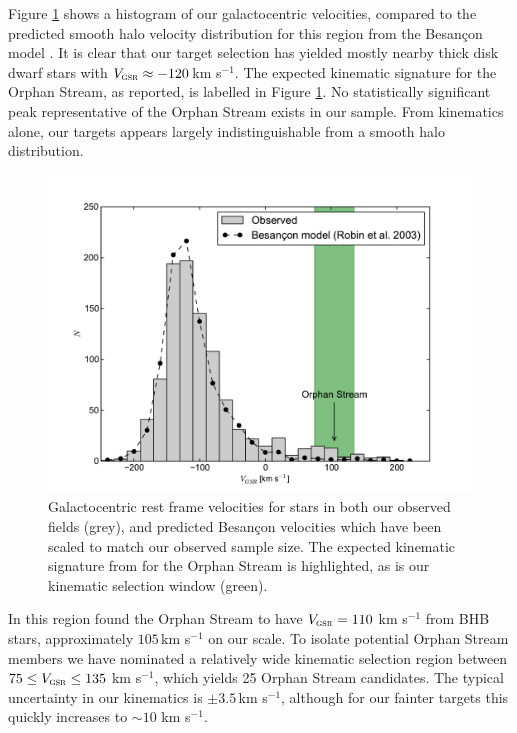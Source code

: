 \documentclass{emulateapj}
\begin{document}
Figure \ref{fig:velocities} shows a histogram of our galactocentric velocities, compared to the predicted smooth halo velocity distribution for this region from the Besan\c{c}on model \citep{Robin;et-al_2003}. It is clear that our target selection has yielded mostly nearby thick disk dwarf stars with $V_{\textsc{gsr}} \approx -120$\,km s$^{-1}$. The expected kinematic signature for the Orphan Stream, as \citet{Newberg;et-al_2010} reported, is labelled in Figure \ref{fig:velocities}. No statistically significant peak representative of the Orphan Stream exists in our sample. From kinematics alone, our targets appears largely indistinguishable from a smooth halo distribution.

\begin{figure}[h]
	\includegraphics[width=\columnwidth]{./figures/vgsr-histogram.pdf}
	\caption{Galactocentric rest frame velocities for stars in both our observed fields (grey), and predicted Besan\c{c}on velocities which have been scaled to match our observed sample size. The expected kinematic signature from \citet{Newberg;et-al_2010} for the Orphan Stream is highlighted, as is our kinematic selection window (green).}
	\label{fig:velocities}
\end{figure}

In this region \citet{Newberg;et-al_2010} found the Orphan Stream to have $V_{\textsc{gsr}} = 110$ km s$^{-1}$ from BHB stars, approximately $105$\,km s$^{-1}$ on our scale. To isolate potential Orphan Stream members we have nominated a relatively wide kinematic selection region between $75 \leq V_{\textsc{gsr}} \leq 135$ km s$^{-1}$, which yields 25 Orphan Stream candidates. The typical uncertainty in our kinematics is $\pm{}3.5$\,km s$^{-1}$, although for our fainter targets this quickly increases to $\sim10$ km s$^{-1}$.
\end{document}
